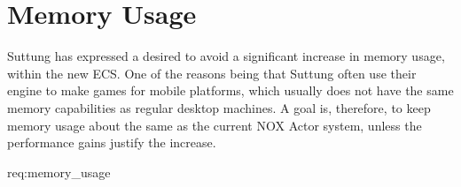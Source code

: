 \section{Memory Usage}
Suttung has expressed a desired to avoid a significant increase in memory usage,
within the new ECS.
One of the reasons being that Suttung often use their engine to
make games for mobile platforms, which usually does not have the same memory capabilities as regular desktop machines.
A goal is, therefore, to keep memory usage about the same as the current
NOX Actor system, unless the performance gains justify the increase.

{req:memory_usage}
